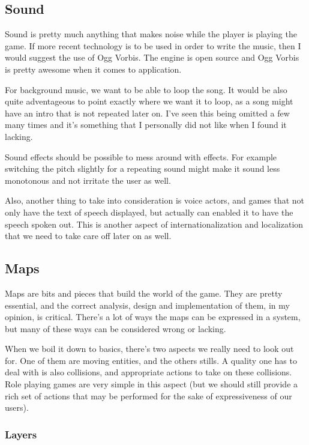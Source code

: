 \subsection{Sound}

Sound is pretty much anything that makes noise while the player is playing the
game. If more recent technology is to be used in order to write the music, then
I would suggest the use of Ogg Vorbis. The engine is open source and Ogg Vorbis
is pretty awesome when it comes to application.

For background music, we want to be able to loop the song. It would be also
quite adventageous to point exactly where we want it to loop, as a song might
have an intro that is not repeated later on. I've seen this being omitted a few
many times and it's something that I personally did not like when I found it
lacking.

Sound effects should be possible to mess around with effects. For example
switching the pitch slightly for a repeating sound might make it sound less
monotonous and not irritate the user as well.

Also, another thing to take into consideration is voice actors, and games that
not only have the text of speech displayed, but actually can enabled it to have
the speech spoken out. This is another aspect of internationalization and
localization that we need to take care off later on as well.

\subsection{Maps}

Maps are bits and pieces that build the world of the game. They are pretty
essential, and the correct analysis, design and implementation of them, in my
opinion, is critical. There's a lot of ways the maps can be expressed in a
system, but many of these ways can be considered wrong or lacking.

When we boil it down to basics, there's two aspects we really need to look out
for. One of them are moving entities, and the others stills. A quality one has
to deal with is also collisions, and appropriate actions to take on these
collisions. Role playing games are very simple in this aspect (but we should
still provide a rich set of actions that may be performed for the sake of
expressiveness of our users).

\subsubsection{Layers}

